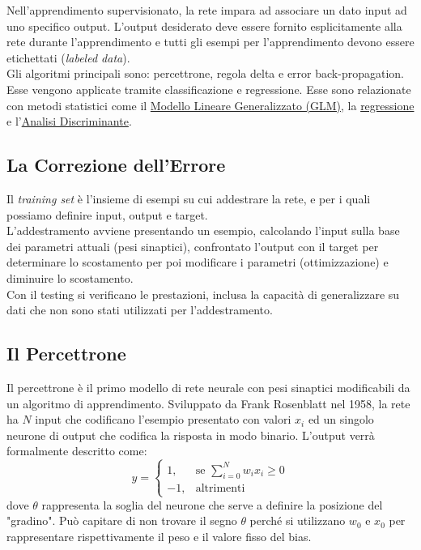 \documentclass[12pt, a4paper]{article}
\begin{document}
Nell'apprendimento supervisionato, la rete impara ad associare un dato input ad uno specifico output. L'output desiderato deve essere fornito esplicitamente alla rete durante l'apprendimento e tutti gli esempi per l'apprendimento devono essere etichettati (\textit{labeled data}).\\
Gli algoritmi principali sono: percettrone, regola delta e error back-propagation. Esse vengono applicate tramite classificazione e regressione. Esse sono relazionate con metodi statistici come il \href{https://it.wikipedia.org/wiki/Modello_lineare_generalizzato}{Modello Lineare Generalizzato (GLM)}, la \href{https://it.wikipedia.org/wiki/Regressione_lineare}{regressione} e l'\href{https://it.wikipedia.org/wiki/Analisi_discriminante}{Analisi Discriminante}.

\subsection{La Correzione dell'Errore}
Il \textit{training set} è l'insieme di esempi su cui addestrare la rete, e per i quali possiamo definire input, output e target.\\
L'addestramento avviene presentando un esempio, calcolando l'input sulla base dei parametri attuali (pesi sinaptici), confrontato l'output con il target per determinare lo scostamento per poi modificare i parametri (ottimizzazione) e diminuire lo scostamento.\\
Con il testing si verificano le prestazioni, inclusa la capacità di generalizzare su dati che non sono stati utilizzati per l'addestramento.

\subsection{Il Percettrone}
Il percettrone è il primo modello di rete neurale con pesi sinaptici modificabili da un algoritmo di apprendimento. Sviluppato da Frank Rosenblatt nel 1958, la rete ha \(N\) input che codificano l'esempio presentato con valori \(x_i\) ed un singolo neurone di output che codifica la risposta in modo binario. 
L'output verrà formalmente descritto come:
\[
    y = 
    \begin{cases} 
        1, & \mbox{se } \sum^N_{i=0}w_ix_i \geq 0 \\
        -1, & \mbox{altrimenti}
    \end{cases}
\]
dove \(\theta\) rappresenta la soglia del neurone che serve a definire la posizione del "gradino". Può capitare di non trovare il segno \(\theta\) perché si utilizzano \(w_0\) e \(x_0\) per rappresentare rispettivamente il peso e il valore fisso del bias.
\end{document}
